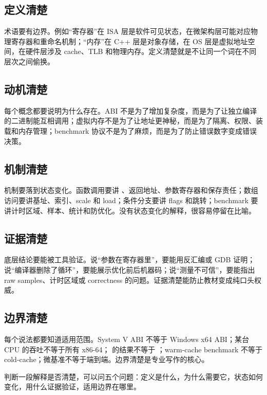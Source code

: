 \subsection{定义清楚}

术语要有边界。例如“寄存器”在 ISA 层是软件可见状态，在微架构层可能对应物理寄存器和重命名机制；“内存”在 C++ 层是对象存储，在 OS 层是虚拟地址空间，在硬件层涉及 cache、TLB 和物理内存。定义清楚就是不让同一个词在不同层次之间偷换。

\subsection{动机清楚}

每个概念都要说明为什么存在。ABI 不是为了增加复杂度，而是为了让独立编译的二进制能互相调用；虚拟内存不是为了让地址更神秘，而是为了隔离、权限、装载和内存管理；benchmark 协议不是为了麻烦，而是为了防止错误数字变成错误决策。

\subsection{机制清楚}

机制要落到状态变化。函数调用要讲 、返回地址、参数寄存器和保存责任；数组访问要讲基址、索引、scale 和 load；条件分支要讲 flags 和跳转；benchmark 要讲计时区域、样本、统计和防优化。没有状态变化的解释，很容易停留在比喻。

\subsection{证据清楚}

底层结论要能被工具验证。说“参数在寄存器里”，要能用反汇编或 GDB 证明；说“编译器删除了循环”，要能展示优化前后机器码；说“测量不可信”，要能指出 raw samples、计时区域或 correctness 的问题。证据清楚能防止教材变成纯口头权威。

\subsection{边界清楚}

每个说法都要知道适用范围。System V ABI 不等于 Windows x64 ABI；某台 CPU 的吞吐不等于所有 x86-64； 的结果不等于 ；warm-cache benchmark 不等于 cold-cache；微基准不等于端到端。边界清楚是专业写作的核心。

\begin{mentalmodel}
判断一段解释是否清楚，可以问五个问题：定义是什么，为什么需要它，状态如何变化，用什么证据验证，适用边界在哪里。
\end{mentalmodel}

